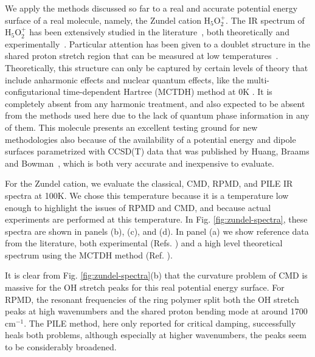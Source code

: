 \documentclass[aps,prb,superscriptaddress,amsmath,amssymb,showpacs,twocolumn]{revtex4}
\begin{document}
We apply the methods discussed so far
to a real and accurate potential energy surface of 
a real molecule, namely, the Zundel cation H$_5$O$_2^+$.
The IR spectrum of  H$_5$O$_2^+$ has been extensively studied in the literature~\cite{Schatteburg2008}, both theoretically 
\cite{AgostiniCiccotti2011, ParkKim2007, VenerSauer2001, SauerDoebler2005, ChengKrause1997, VendrellMeyer2007, 
BaerMarxMathias2010, KaledinBowmanJordan2009, HuangBraamsBowman2005} 
and experimentally~\cite{YehLee1989, GuascoJohnson2011, AsmisScience2003, HammerBowmanCarter2005, FridgenMaitre2004}. 
Particular attention has been given to a doublet structure in the 
shared proton stretch region that can be measured
at low temperatures~\cite{GuascoJohnson2011, HammerBowmanCarter2005}.
Theoretically,  this structure can only be captured
by certain levels of theory that include anharmonic effects and nuclear quantum effects, 
like the multi-configutarional time-dependent Hartree (MCTDH) method at
0K \cite{VendrellMeyer2007}. It is completely absent from any harmonic treatment,
and also expected to be absent from the methods used here due to the lack
of quantum phase information in any of them.
This molecule presents an excellent testing ground for new methodologies
also because of the availability of a potential energy and dipole surfaces parametrized
with CCSD(T) data that was published by Huang, Braams and Bowman~\cite{HuangBraamsBowman2005},
which is both very accurate and inexpensive to evaluate. 

For the Zundel cation, we evaluate the classical, CMD, RPMD, and PILE IR spectra at 100K.
We chose this temperature because it is a temperature low enough to highlight the issues of
RPMD and CMD, and because actual experiments are performed at this temperature\cite{AsmisScience2003}.
In Fig. \ref{fig:zundel-spectra}, these spectra are shown in panels (b), (c), and (d). In panel (a)
we show reference data from the literature, both experimental (Refs. \cite{YehLee1989,AsmisScience2003}) and a high level theoretical
spectrum using the MCTDH method (Ref. \cite{VendrellMeyer2007}). 

It is clear from
Fig. \ref{fig:zundel-spectra}(b)
that the curvature problem of CMD is massive for the OH stretch peaks for this
real potential energy surface. For RPMD, the resonant frequencies of the
ring polymer split both the OH stretch peaks at high wavenumbers and the
shared proton bending mode at around 1700 cm$^{-1}$. The PILE method,
here only reported for critical damping, successfully heals both problems,
although especially at higher wavenumbers, the peaks seem to be considerably broadened.
\end{document}
